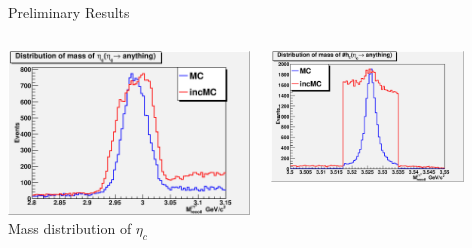 \documentclass{beamer}
\begin{document}
\begin{frame}{Preliminary Results}
\begin{columns}
\begin{column}{0.5\textwidth}
\begin{center}
\includegraphics[width=1\textwidth,angle=0]{figures/Pi0hc_recoil_mass_of_etac.eps}\\
Mass distribution of $\eta_c$
\end{center}
\end{column}
\begin{column}{0.5\textwidth}
\begin{center}
\includegraphics[width=0.8\textwidth,angle=0]{figures/Pi0hc_recoil_mass_of_hc.eps}\\

\end{center}
\end{column}
\end{columns}
\end{frame}
\end{document}
